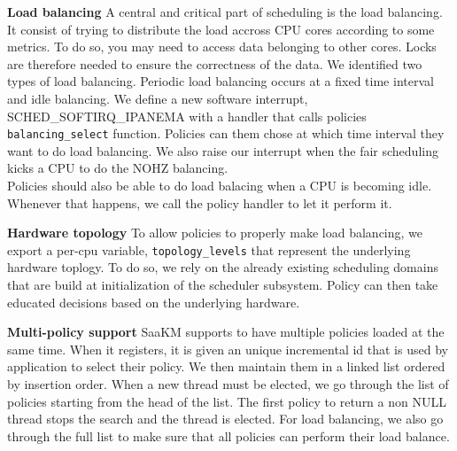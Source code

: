 \par \textbf{Load balancing} A central and critical part of scheduling is the load balancing. It consist of trying to distribute the load accross CPU cores according to some metrics. To do so, you may need to access data belonging to other cores. Locks are therefore needed to ensure the correctness of the data. We identified two types of load balancing. Periodic load balancing occurs at a fixed time interval and idle balancing. We define a new software interrupt, SCHED\_SOFTIRQ\_IPANEMA with a handler that calls policies \texttt{balancing\_select} function. Policies can them chose at which time interval they want to do load balancing. We also raise our interrupt when the fair scheduling kicks a CPU to do the NOHZ balancing. \\
Policies should also be able to do load balacing when a CPU is becoming idle. Whenever that happens, we call the policy handler to let it perform it. \newline

\par \textbf{Hardware topology} To allow policies to properly make load balancing, we export a per-cpu variable, \texttt{topology\_levels} that represent the underlying hardware toplogy. To do so, we rely on the already existing scheduling domains that are build at initialization of the scheduler subsystem. Policy can then take educated decisions based on the underlying hardware.\newline

\par \textbf{Multi-policy support} SaaKM supports to have multiple policies loaded at the same time. When it registers, it is given an unique incremental id that is used by application to select their policy. We then maintain them in a linked list ordered by insertion order. When a new thread must be elected, we go through the list of policies starting from the head of the list. The first policy to return a non NULL thread stops the search and the thread is elected. For load balancing, we also go through the full list to make sure that all policies can perform their load balance.

